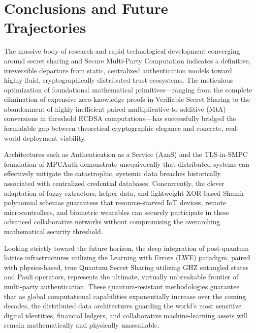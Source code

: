 \documentclass[11pt, a4paper]{article}
\begin{document}
\section*{Conclusions and Future Trajectories}
The massive body of research and rapid technological development converging around secret sharing and Secure Multi-Party Computation indicates a definitive, irreversible departure from static, centralized authentication models toward highly fluid, cryptographically distributed trust ecosystems. The meticulous optimization of foundational mathematical primitives—ranging from the complete elimination of expensive zero-knowledge proofs in Verifiable Secret Sharing to the abandonment of highly inefficient paired multiplicative-to-additive (MtA) conversions in threshold ECDSA computations—has successfully bridged the formidable gap between theoretical cryptographic elegance and concrete, real-world deployment viability.

Architectures such as Authentication as a Service (AaaS) and the TLS-in-SMPC foundation of MPCAuth demonstrate unequivocally that distributed systems can effectively mitigate the catastrophic, systemic data breaches historically associated with centralized credential databases. Concurrently, the clever adaptation of fuzzy extractors, helper data, and lightweight XOR-based Shamir polynomial schemas guarantees that resource-starved IoT devices, remote microcontrollers, and biometric wearables can securely participate in these advanced collaborative networks without compromising the overarching mathematical security threshold.

Looking strictly toward the future horizon, the deep integration of post-quantum lattice infrastructures utilizing the Learning with Errors (LWE) paradigm, paired with physics-based, true Quantum Secret Sharing utilizing GHZ entangled states and Pauli operators, represents the ultimate, virtually unbreakable frontier of multi-party authentication. These quantum-resistant methodologies guarantee that as global computational capabilities exponentially increase over the coming decades, the distributed data architectures guarding the world's most sensitive digital identities, financial ledgers, and collaborative machine-learning assets will remain mathematically and physically unassailable.
\end{document}
